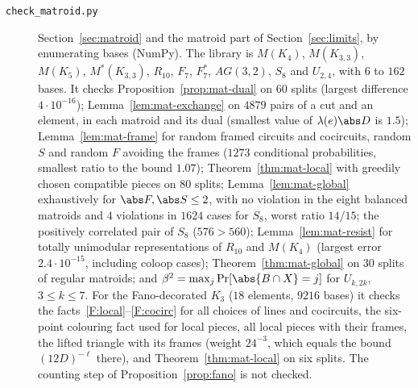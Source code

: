 \begin{description}
\item[\texttt{check\_matroid.py}] Section~\ref{sec:matroid} and the matroid part of Section~\ref{sec:limits}, by enumerating bases (NumPy). The library is $M(K_4)$, $M(K_{3,3})$, $M(K_5)$, $M^*(K_{3,3})$, $R_{10}$, $F_7$, $F_7^*$, $AG(3,2)$, $S_8$ and $U_{2,4}$, with $6$ to $162$ bases. It checks Proposition~\ref{prop:mat-dual} on $60$ splits (largest difference $4\cdot10^{-16}$); Lemma~\ref{lem:mat-exchange} on $4879$ pairs of a cut and an element, in each matroid and its dual (smallest value of $\lambda(e)\abs D$ is $1.5$); Lemma~\ref{lem:mat-frame} for random framed circuits and cocircuits, random $S$ and random $F$ avoiding the frames ($1273$ conditional probabilities, smallest ratio to the bound $1.07$); Theorem~\ref{thm:mat-local} with greedily chosen compatible pieces on $80$ splits; Lemma~\ref{lem:mat-global} exhaustively for $\abs F,\abs S\le2$, with no violation in the eight balanced matroids and $4$ violations in $1624$ cases for $S_8$, worst ratio $14/15$; the positively correlated pair of $S_8$ ($576>560$); Lemma~\ref{lem:mat-resist} for totally unimodular representations of $R_{10}$ and $M(K_4)$ (largest error $2.4\cdot10^{-15}$, including coloop cases); Theorem~\ref{thm:mat-global} on $30$ splits of regular matroids; and $\beta^2=\max_j\Pr[\abs{B\cap X}=j]$ for $U_{k,2k}$, $3\le k\le7$. For the Fano-decorated $K_3$ ($18$ elements, $9216$ bases) it checks the facts~\ref{F:local}--\ref{F:cocirc} for all choices of lines and cocircuits, the six-point colouring fact used for local pieces, all local pieces with their frames, the lifted triangle with its frames (weight $24^{-3}$, which equals the bound $(12D)^{-\ell}$ there), and Theorem~\ref{thm:mat-local} on six splits. The counting step of Proposition~\ref{prop:fano} is not checked.

\end{description}
